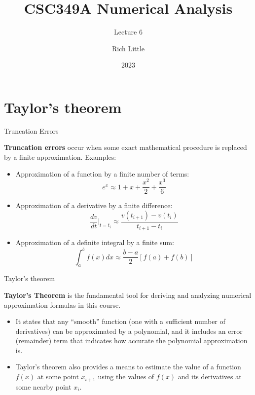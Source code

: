\documentclass[12pt]{beamer}
\title[CSC349A Numerical Analysis]{CSC349A Numerical Analysis}
\subtitle[Lecture 6]{Lecture 6}
\date[2023]{2023}
\author[R. Little]{Rich Little}
\institute[University of Victoria]{University of Victoria}
\begin{document}
\frame{\maketitle} %



\section{Taylor's theorem} 

\begin{frame}{Truncation Errors} 

{\bf Truncation errors} occur when some exact mathematical procedure is
replaced by a finite approximation. Examples: 
\begin{itemize} 
\item Approximation of a function by a finite number of terms: 
\[ 
e^{x} \approx 1 + x + \frac{x^2}{2} + \frac{x^3}{6}
\]
\item Approximation of a derivative by a finite difference: 
\[
\frac{dv}{dt}|_{t=t_i} \approx \frac{v(t_{i+1}) - v(t_{i})}{t_{i+1} - t_{i}}
\]
\item Approximation of a definite integral by a finite sum:
\[
\int_{a}^{b} f(x)dx \approx \frac{b-a}{2} \left[ f(a) + f(b) \right]
\]
\end{itemize} 


\end{frame} 




\begin{frame}{Taylor's theorem}

{\bf Taylor's Theorem} is the fundamental tool for deriving and analyzing numerical
approximation formulas in this course. 

\begin{itemize}

\item{It states that any ``smooth'' function (one with a sufficient number of derivatives) can be
approximated by a polynomial, and it includes an error (remainder)
term that indicates how accurate the polynomial approximation
is.}

\item{Taylor's theorem also provides a means to estimate the value of a
function $f(x)$ at some point $x_{i+1}$ using the values of $f(x)$ and
its derivatives at some nearby point $x_{i}$.}

\end{itemize}
\end{frame} 
\end{document}
